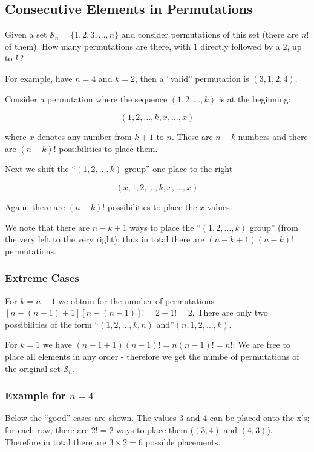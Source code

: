 
\subsection{Consecutive Elements in Permutations}

Given a set \(\mathcal{S}_n = \{1,2,3,\ldots,n\}\) and consider
permutations of this set (there are \(n!\) of them). How many
permutations are there, with \(1\) directly followed by a \(2\), up to
\(k\)?

For example, have \(n=4\) and \(k=2\), then a ``valid'' permutation is
\((3,1,2,4)\).

Consider a permutation where the sequence \((1,2,\ldots,k)\) is at the
beginning:

\[
(1,2,\ldots,k,x,\ldots,x)
\]

where \(x\) denotes any number from \(k+1\) to \(n\). These are \(n-k\)
numbers and there are \((n-k)!\) possibilities to place them.

Next we shift the ``\((1,2,\ldots,k)\) group'' one place to the right

\[
(x, 1,2,\ldots,k,x,\ldots,x)
\]

Again, there are \((n-k)!\) possibilities to place the \(x\) values.

We note that there are \(n-k+1\) ways to place the ``\((1,2,\ldots,k)\)
group'' (from the very left to the very right); thus in total there are
\((n-k+1)(n-k)!\) permutations.

\subsubsection{Extreme Cases}

For \(k=n-1\) we obtain for the number of permutations
\([n-(n-1)+1][n-(n-1)]! = 2+1! = 2\). There are only two possibilities
of the form ``\((1,2,\ldots,k,n)\) and''\((n,1,2,\ldots,k)\).

For \(k=1\) we have \((n-1+1)(n-1)! = n(n-1)! = n!\): We are free to
place all elements in any order - therefore we get the numbe of
permutations of the original set \(\mathcal{S}_n\).

\subsubsection{Example for \(n=4\)}

Below the ``good'' cases are shown. The values 3 and 4 can be placed
onto the x's; for each row, there are \(2!=2\) ways to place them
(\((3,4)\) and \((4,3)\)). Therefore in total there are
\(3 \times 2 = 6\) possible placements.



